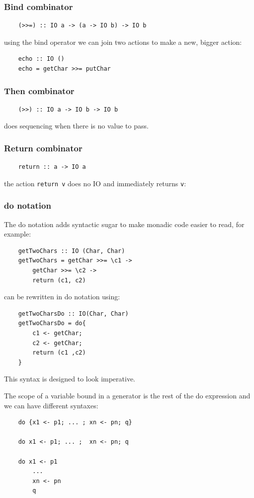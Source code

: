 \subsubsection{Bind combinator}
\begin{verbatim}
    (>>=) :: IO a -> (a -> IO b) -> IO b
\end{verbatim}
using the bind operator we can join two actions to make a new, bigger action:
\begin{verbatim}
    echo :: IO ()
    echo = getChar >>= putChar
\end{verbatim}

\subsubsection{Then combinator}
\begin{verbatim}
    (>>) :: IO a -> IO b -> IO b
\end{verbatim}
does sequencing when there is no value to pass.

\subsubsection{Return combinator}
\begin{verbatim}
    return :: a -> IO a
\end{verbatim}
the action \verb|return v| does no IO and immediately returns \verb|v|:

\subsubsection{do notation}
The do notation adds syntactic sugar to make monadic code easier to read, for example:
\begin{verbatim}
    getTwoChars :: IO (Char, Char)
    getTwoChars = getChar >>= \c1 ->
        getChar >>= \c2 ->
        return (c1, c2)
\end{verbatim}
can be rewritten in do notation using:
\begin{verbatim}
    getTwoCharsDo :: IO(Char, Char)
    getTwoCharsDo = do{
        c1 <- getChar;
        c2 <- getChar;
        return (c1 ,c2)
    }
\end{verbatim}
This syntax is designed to look imperative.

The scope of a variable bound in a generator is the rest of the do expression and we can have different syntaxes:
\begin{verbatim}
    do {x1 <- p1; ... ; xn <- pn; q}

    do x1 <- p1; ... ;  xn <- pn; q

    do x1 <- p1
        ...
        xn <- pn
        q
\end{verbatim}

